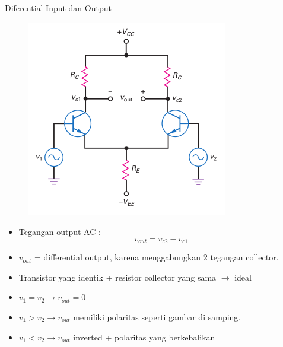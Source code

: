 \documentclass[aspectratio=169]{beamer}
\begin{document}
\begin{frame}{Diferential Input dan Output}
	\begin{multicols}{2}
		\begin{figure}
			\centering
			\includegraphics[height=0.7\textheight]{gambar/01.differential_input_output}
		\end{figure}
		\columnbreak
		\begin{itemize}
			\item Tegangan output AC :\\
			
			\begin{equation} \label{pers.1}
				v_{out} =  v_{c2} - v_{c1}
			\end{equation}
		
			\item $ v_{out} $ = differential output, karena menggabungkan 2 tegangan collector.
			\item Transistor yang identik + resistor collector yang sama $ \rightarrow $ ideal
			\item $ v_1 = v_2 \rightarrow v_{out} = 0 $
			\item $ v_1 > v_2 \rightarrow v_{out} $ memiliki polaritas seperti gambar di samping.
			\item $ v_1 < v_2 \rightarrow v_{out} $ inverted + polaritas yang berkebalikan
		\end{itemize}
	\end{multicols}
\end{frame}
\end{document}
